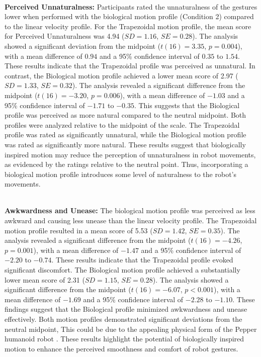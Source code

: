 \documentclass{CSSRforAfrica}
\begin{document}
~\\
\noindent \textbf{Perceived Unnaturalness:} 
Participants rated the unnaturalness of the gestures lower when performed with the biological motion profile (Condition 2) compared to the linear velocity profile. 
For the Trapezoidal motion profile, the mean score for Perceived Unnaturalness was 4.94 ($SD = 1.16$, $SE = 0.28$). The analysis showed a significant deviation from the midpoint ($t(16) = 3.35$, $p = 0.004$), with a mean difference of $0.94$ and a 95\% confidence interval of $0.35$ to $1.54$. These results indicate that the Trapezoidal profile was perceived as unnatural.
In contrast, the Biological motion profile achieved a lower mean score of 2.97 ($SD = 1.33$, $SE = 0.32$). The analysis revealed a significant difference from the midpoint ($t(16) = -3.20$, $p = 0.006$), with a mean difference of $-1.03$ and a 95\% confidence interval of $-1.71$ to $-0.35$. This suggests that the Biological profile was perceived as more natural compared to the neutral midpoint.
Both profiles were analyzed relative to the midpoint of the scale. The Trapezoidal profile was rated as significantly unnatural, while the Biological motion profile was rated as significantly more natural. These results suggest that biologically inspired motion may reduce the perception of unnaturalness in robot movements, as evidenced by the ratings relative to the neutral point. Thus, incorporating a biological motion profile introduces some level of naturalness to the robot's movements. 


~\\
\noindent \textbf{Awkwardness and Unease:}
The biological motion profile was perceived as less awkward and causing less unease than the linear velocity profile. 
The Trapezoidal motion profile resulted in a mean score of 5.53 ($SD = 1.42$, $SE = 0.35$). The analysis revealed a significant difference from the midpoint ($t(16) = -4.26$, $p = 0.001$), with a mean difference of $-1.47$ and a 95\% confidence interval of $-2.20$ to $-0.74$. These results indicate that the Trapezoidal profile evoked significant discomfort. 
The Biological motion profile achieved a substantially lower mean score of 2.31 ($SD = 1.15$, $SE = 0.28$). The analysis showed a significant difference from the midpoint ($t(16) = -6.07$, $p < 0.001$), with a mean difference of $-1.69$ and a 95\% confidence interval of $-2.28$ to $-1.10$. These findings suggest that the Biological profile minimized awkwardness and unease effectively.
Both motion profiles demonstrated significant deviations from the neutral midpoint, This could be due to the appealing physical form of the Pepper humanoid robot \cite{VernonSandini2024}. These results highlight the potential of biologically inspired motion to enhance the perceived smoothness and comfort of robot gestures.
\end{document}
